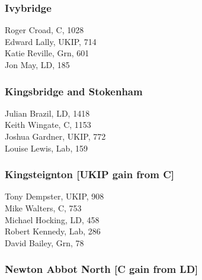 \documentclass[a4paper,openany,10pt]{book}
\begin{document}
\subsubsection*{Ivybridge}



Roger Croad, C, 1028\\
Edward Lally, UKIP, 714\\
Katie Reville, Grn, 601\\
Jon May, LD, 185\\


\subsubsection*{Kingsbridge and Stokenham}



Julian Brazil, LD, 1418\\
Keith Wingate, C, 1153\\
Joshua Gardner, UKIP, 772\\
Louise Lewis, Lab, 159\\


\subsubsection*{Kingsteignton \hspace*{\fill}\nolinebreak[1]%
\enspace\hspace*{\fill}
[UKIP gain from C]}



Tony Dempster, UKIP, 908\\
Mike Walters, C, 753\\
Michael Hocking, LD, 458\\
Robert Kennedy, Lab, 286\\
David Bailey, Grn, 78\\


\subsubsection*{Newton Abbot North \hspace*{\fill}\nolinebreak[1]%
\enspace\hspace*{\fill}
[C gain from LD]}

\end{document}

